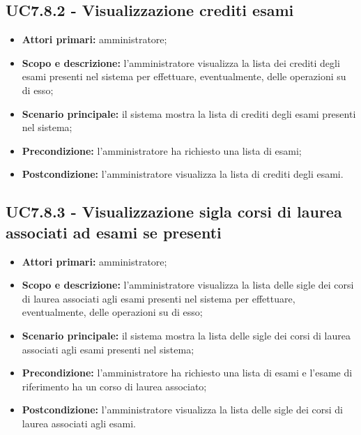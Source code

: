 \documentclass[AnalisiDeiRequisiti.tex]{subfiles}
\begin{document}
\subsection{UC7.8.2 - Visualizzazione crediti esami}
\begin{itemize}
	\item \textbf{Attori primari:} amministratore;
	\item \textbf{Scopo e descrizione:} l'amministratore visualizza la lista dei crediti degli esami presenti nel sistema per effettuare, eventualmente, delle operazioni su di esso;
	\item \textbf{Scenario principale:} il sistema mostra la lista di crediti degli esami presenti nel sistema;
	\item \textbf{Precondizione:} l'amministratore ha richiesto una lista di esami; 
	\item \textbf{Postcondizione:} l'amministratore visualizza la lista di crediti degli esami.
\end{itemize}
\subsection{UC7.8.3 - Visualizzazione sigla corsi di laurea associati ad esami se presenti}
\begin{itemize}
	\item \textbf{Attori primari:} amministratore;
	\item \textbf{Scopo e descrizione:} l'amministratore visualizza la lista delle sigle dei corsi di laurea associati agli esami presenti nel sistema per effettuare, eventualmente, delle operazioni su di esso;
	\item \textbf{Scenario principale:} il sistema mostra la lista delle sigle dei corsi di laurea associati agli esami presenti nel sistema;
	\item \textbf{Precondizione:} l'amministratore ha richiesto una lista di esami e l'esame di riferimento ha un corso di laurea associato; 
	\item \textbf{Postcondizione:} l'amministratore visualizza la lista delle sigle dei corsi di laurea associati agli esami.
\end{itemize}
\end{document}

